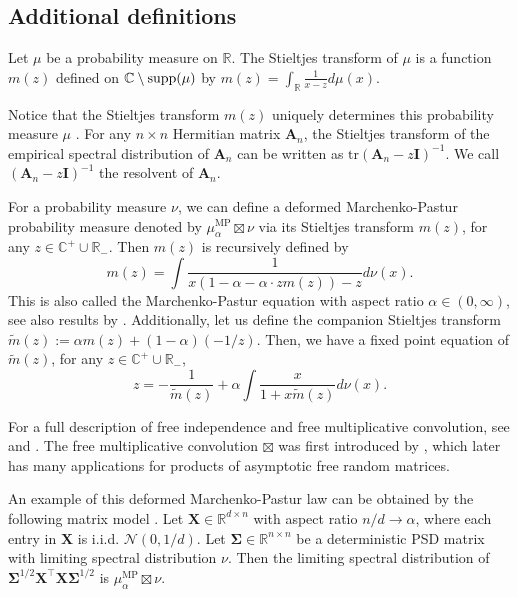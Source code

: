\documentclass[twoside,11pt]{article}
\newcommand{\R}{\mathbb{R}}
\def\bI{{\mathbf I}}
\newcommand{\tr}{\text{tr}}
\def\bA{{\boldsymbol A}}
\def\bX{{\boldsymbol X}}
\def\bSigma{{\boldsymbol \Sigma}}
\def\supp{{\rm supp}}
\newcommand{\1}{\mathbf{1}}
\begin{document}
\subsection{Additional definitions}
\begin{definition}
 Let $\mu$ be a probability measure on $\R$. The Stieltjes transform of $\mu$ is a function $m(z)$ defined on $\mathbb C\setminus \supp{(\mu)}$ by
$
     m(z)=\int_{\R} \frac{1}{x-z} d\mu(x).$
\end{definition}Notice that the Stieltjes transform $m(z)$ uniquely determines this probability measure $\mu$ \citep[Appendix B.2]{bai2010spectral}. For any $n\times n$ Hermitian matrix $\bA_n$, the Stieltjes transform of the empirical spectral distribution of $\bA_n$ can be written as $\tr (\bA_n-z\bI)^{-1}$. We call $(\bA_n-z \bI)^{-1}$ the resolvent of $\bA_n$.
 
 
\begin{definition}\label{def:free_convolution}
For a probability measure $\nu$, we can define a deformed  Marchenko-Pastur  probability measure  denoted by $\mu_{\alpha}^{\mathrm{MP}}\boxtimes\nu$ via its Stieltjes transform $m(z)$, for any $z\in \mathbb C^+\cup \R_{-}$. Then $m(z)$ is recursively defined by 
\[m(z)=\int \frac{1}{x(1-\alpha-\alpha\cdot zm(z))-z}d\nu(x).\]
This is also called the Marchenko-Pastur equation with aspect ratio $\alpha\in(0,\infty)$, see also results by \cite{marchenko1967distribution,bai2010spectral,yao2015sample}.
Additionally, let us define the companion Stieltjes transform $\widetilde m(z):=\alpha m(z)+(1-\alpha)(-1/z).$ Then, we have a fixed point equation of $\widetilde m(z)$, for any $z\in \mathbb C^+\cup \R_{-}$,
\begin{equation}\label{eq:companion}
    z = -\frac{1}{\widetilde m(z)}+\alpha \int \frac{x}{1+x\widetilde m(z)}d\nu(x).
\end{equation}

\end{definition}
For a full description of free independence and free multiplicative convolution, see \citep[Lecture 18]{nica2006lectures} and \citep[Section 5.3.3]{anderson2010introduction}. The free multiplicative convolution $\boxtimes$ was first introduced by \cite{voiculescu1987multiplication}, which later has many applications for products of asymptotic free random matrices. 


An example of this deformed Marchenko-Pastur law can be obtained by the following matrix model \citep{marchenko1967distribution}. Let $\bX\in \mathbb R^{d\times n}$ with aspect ratio $n/d\to \alpha$, where each entry in $\bX$ is i.i.d. $\mathcal N(0,1/d)$. Let $\bSigma\in \R^{n\times n}$ be a deterministic PSD matrix with limiting spectral distribution $\nu$. Then the limiting spectral distribution of $\bSigma^{1/2}\bX^\top \bX \bSigma^{1/2}$ is $\mu_{\alpha}^{\mathrm{MP}}\boxtimes\nu$.
 
\end{document}
